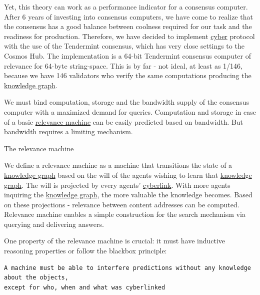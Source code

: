 \documentclass[8pt,oneside]{amsart}
\makeatletter
\newcommand{\linkred}[2]{\href{#1}{\color{red}{#2}}}
\newcommand{\linkgreen}[2]{\href{#1}{\color{green}{#2}}}
\renewcommand\subsection{\@startsection{subsection}
                                    {2}{\z@}
                                    {-3.25ex\@plus -1ex \@minus -.2ex}
                                    {0ex \@plus .2ex}
                                    {\play\Large}
                        }
\newcommand{\titleSection}[1]{\subsection{#1}}
\makeatother
\begin{document}
Yet, this theory can work as a performance indicator for a consensus computer. After 6 years of investing into consensus computers, we have come to realize that the \linkgreen{https://ipfs.io/ipfs/QmaMtD7xDgghqgjN62zWZ5TBGFiEjGQtuZBjJ9sMh816KJ}{Tendermint} consensus has a good balance between coolness required for our task and the readiness for production. Therefore, we have decided to implement {\hyperref[cyber]{cyber}} protocol with the use of the Tendermint consensus, which has very close settings to the Cosmos Hub. The \linkred{https://github.com/cybercongress/cyberd}{cyberd} implementation is a 64-bit Tendermint consensus computer of relevance for 64-byte string-space. This is by far - not ideal, at least as 1/146, because we have 146 validators who verify the same computations producing the {\hyperref[knowledge-graph]{knowledge graph}}.

We must bind computation, storage and the bandwidth supply of the consensus computer with a maximized demand for queries. Computation and storage in case of a basic {\hyperref[relevance-machine]{relevance machine}} can be easily predicted based on bandwidth. But bandwidth requires a limiting mechanism.

\titleSection{The relevance machine}\label{relevance-machine}

We define a relevance machine as a machine that transitions the state of a {\hyperref[knowledge-graph]{knowledge graph}} based on the will of the agents wishing to learn that {\hyperref[knowledge-graph]{knowledge graph}}. The will is projected by every agents' {\hyperref[cyberlinks]{cyberlink}}. With more agents inquiring the {\hyperref[knowledge-graph]{knowledge graph}}, the more valuable the knowledge becomes. Based on these projections - relevance between content addresses can be computed. Relevance machine enables a simple construction for the search mechanism via querying and delivering answers.

One property of the relevance machine is crucial: it must have inductive reasoning properties or follow the blackbox principle:

\begin{lstlisting}
A machine must be able to interfere predictions without any knowledge about the objects,
except for who, when and what was cyberlinked
\end{lstlisting}
\end{document}
